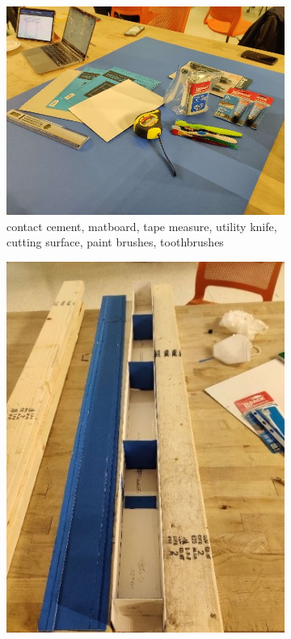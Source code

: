 \documentclass[11pt]{article}
\newcommand{\imagewidth}{.5\linewidth}
\begin{document}
\begin{figure}[h]
    \centering
    \begin{subfigure}[b]{\imagewidth}
        \centering
        \includegraphics[width=\textwidth]{img/construction_1.jpg}
        \caption{\label{c1} contact cement, matboard, tape measure, utility knife, cutting surface, paint brushes, toothbrushes}
    \end{subfigure}
    \hspace{.08\linewidth}
    \begin{subfigure}[b]{.263\linewidth}
        \centering
        \includegraphics[width=\textwidth]{img/construction_2.jpg}

\end{subfigure}
\end{figure}
\end{document}
